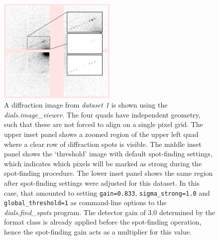 \documentclass[preprint]{iucr}
\newcommand{\dialsfindspots}{\emph{dials.find\_spots}\xspace}
\newcommand{\dialsimageviewer}{\emph{dials.image\_viewer}\xspace}
\newcommand{\code}{\texttt}
\begin{document}
\begin{figure}
  \label{fig:spotfinding}
  \centering
  \caption{
    A diffraction image from \emph{dataset 1} is shown using the \dialsimageviewer.
    The four quads have independent geometry, such that these are not forced
    to align on a single pixel grid. The upper inset panel shows a zoomed
    region of the upper left quad where a clear row of diffraction spots is
    visible. The middle inset panel shows the `threshold' image with default
    spot-finding settings, which indicates which pixels will be marked as
    strong during the spot-finding procedure. The lower inset panel shows the
    same region after spot-finding settings were adjusted for this dataset.
    In this case, that amounted to setting \code{gain=0.833},
    \code{sigma\_strong=1.0} and \code{global\_threshold=1} as command-line
    options to the \dialsfindspots program. The detector gain of 3.0 determined
    by the format class is already applied before the spot-finding operation,
    hence the spot-finding gain acts as a multiplier for this value.
  }
  \includegraphics[width=0.5\textwidth]{Figures/spotfinding/spot_finding.png}
\end{figure}
\end{document}
